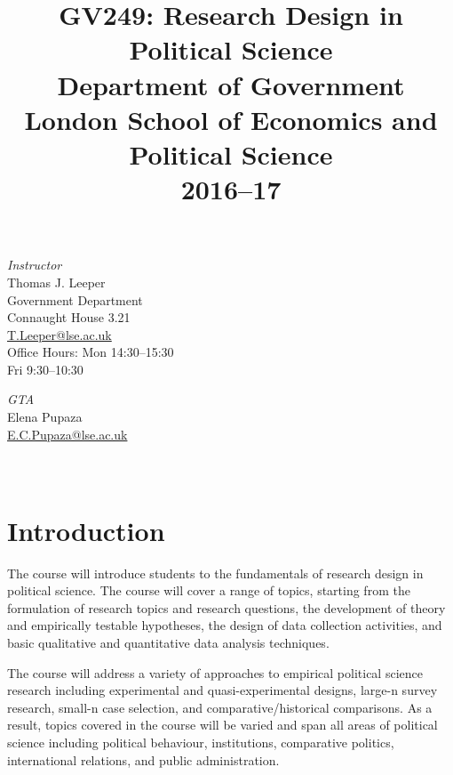 \documentclass[12pt,a4paper]{article}
\title{\textbf{GV249: Research Design in Political Science}\\Department of Government\\London School of Economics and Political Science\\2016--17}
\author{}
\date{}
\begin{document}
\nobibliography*
\faketableofcontents

\maketitle

\vspace{-4em}

\begin{minipage}[t]{0.5\linewidth}
\textit{Instructor}\\
Thomas J. Leeper\\
Government Department\\
Connaught House 3.21\\
\href{mailto:t.leeper@lse.ac.uk}{T.Leeper@lse.ac.uk}\\
Office Hours: Mon 14:30--15:30\\
\phantom{Office Hours:} Fri 9:30--10:30\\
\end{minipage}
\begin{minipage}[t]{0.5\linewidth}
\textit{GTA}\\
Elena Pupaza\\
\href{mailto:E.C.Pupaza@lse.ac.uk}{E.C.Pupaza@lse.ac.uk}\\
\hspace{1em}\\
\hspace{1em}\\
\end{minipage}

\section{Introduction}
The course will introduce students to the fundamentals of research design in political science. The course will cover a range of topics, starting from the formulation of research topics and research questions, the development of theory and empirically testable hypotheses, the design of data collection activities, and basic qualitative and quantitative data analysis techniques. 

The course will address a variety of approaches to empirical political science research including experimental and quasi-experimental designs, large-n survey research, small-n case selection, and comparative/historical comparisons. As a result, topics covered in the course will be varied and span all areas of political science including political behaviour, institutions, comparative politics, international relations, and public administration.
\end{document}
